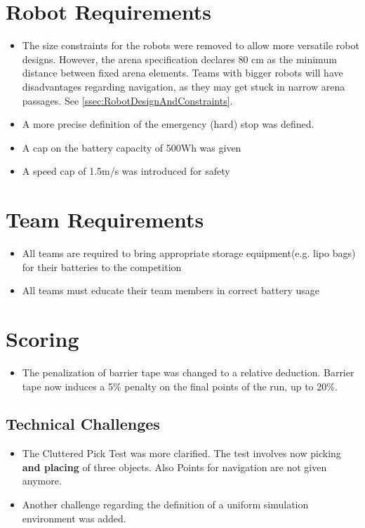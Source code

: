 \section{Robot Requirements}
\begin{itemize}
  \item The size constraints for the robots were removed to allow more versatile robot designs. 
  		However, the arena specification declares 80 cm as the minimum distance between fixed arena elements.
  		Teams with bigger robots will have disadvantages regarding navigation, as they may get stuck in narrow arena passages. 
  		See \ref{ssec:RobotDesignAndConstraints}.
  \item A more precise definition of the emergency (hard) stop was defined.
  \item A cap on the battery capacity of 500Wh was given
  \item A speed cap of 1.5m/s was introduced for safety
\end{itemize}

\section{Team Requirements}
\begin{itemize}
  \item All teams are required to bring appropriate storage equipment(e.g. lipo bags) for their batteries to the competition
  \item All teams must educate their team members in correct battery usage 
\end{itemize}

\section{Scoring}
\begin{itemize}
  \item The penalization of barrier tape was changed to a relative deduction. Barrier tape now induces a 5\% penalty on the final points of the run, up to 20\%.
\end{itemize}

\subsection{Technical Challenges}
\begin{itemize}
  \item The Cluttered Pick Test was more clarified. The test involves now picking \textbf{and placing} of three objects. Also Points for navigation are not given anymore. 
  \item Another challenge regarding the definition of a uniform simulation environment was added.
\end{itemize}
